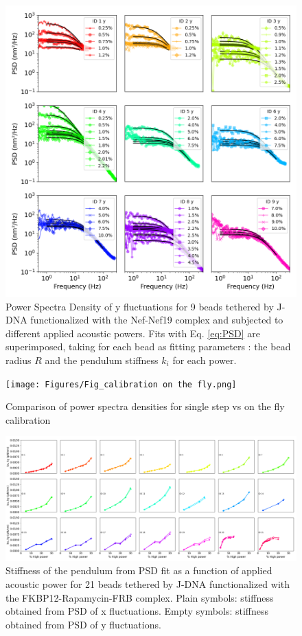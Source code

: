 \documentclass{biophys-new}
\begin{document}
\begin{figure}[hbt!]
	\centering
	\centerline {\includegraphics[width=0.75\linewidth]{Figures/multispectrumy_Nef.png}}
	\caption{%
	Power Spectra Density of y fluctuations for 9 beads tethered by J-DNA functionalized with the Nef-Nef19 complex and subjected to different applied acoustic powers. Fits with Eq. \ref{eq:PSD} are superimposed, taking for each bead as fitting parameters : the bead radius $R$ and the pendulum stiffness $k_i$ for each power.}
	\label{fig:FitSpectraNef}	
\end{figure}

\begin{figure}[hbt!]
	\centering
	\centerline {\texttt{[image: Figures/Fig\_calibration on the fly.png]}}
	\caption{Comparison of power spectra densities for single step vs on the fly calibration}
	\label{fig:Onthefly}	
\end{figure}

\begin{figure}
	\centering
	\centerline {\includegraphics[width=1\linewidth]{Figures/Power_Stiffness_Ter_Rapa.png}}
	\caption{Stiffness of the pendulum from PSD fit as a function of applied acoustic power for 21 beads tethered by J-DNA functionalized with the FKBP12-Rapamycin-FRB complex. Plain symbols: stiffness obtained from PSD of x fluctuations. Empty symbols: stiffness obtained from PSD of y fluctuations.}
	\label{fig:PowerStiffness}	
\end{figure}
\end{document}
